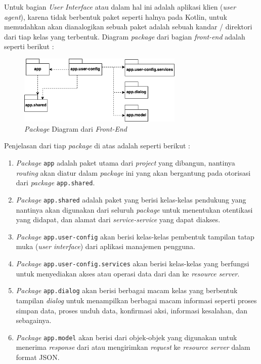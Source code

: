 \documentclass[pdftex,12pt, oneside]{article}
\begin{document}
Untuk bagian \textit{User Interface} atau dalam hal ini adalah aplikasi klien (\textit{user agent}), karena tidak berbentuk paket seperti halnya pada Kotlin, untuk memudahkan akan dianalogikan sebuah paket adalah sebuah kandar / direktori dari tiap kelas yang terbentuk. Diagram \textit{package} dari bagian \textit{front-end} adalah seperti berikut :

\begin{figure}[H]
	\centering
	\includegraphics[width=0.7\textwidth]{./resources/package-dia-fe}
	\caption{\textit{Package} Diagram dari \textit{Front-End}}
	\label{fig:package-dia-fe}
\end{figure}

Penjelasan dari tiap \textit{package} di atas adalah seperti berikut :

\begin{enumerate}
	\item \textit{Package} \texttt{app} adalah paket utama dari \textit{project} yang dibangun, nantinya \textit{routing} akan diatur dalam \textit{package} ini yang akan bergantung pada otorisasi dari \textit{package} \texttt{app.shared}.
	
	\item \textit{Package} \texttt{app.shared} adalah paket yang berisi kelas-kelas pendukung yang nantinya akan digunakan dari seluruh \textit{package} untuk menentukan otentikasi yang didapat, dan alamat dari \textit{service-service} yang dapat diakses.
	
	\item \textit{Package} \texttt{app.user-config} akan berisi kelas-kelas pembentuk tampilan tatap muka (\textit{user interface}) dari aplikasi manajemen pengguna.
	
	\item \textit{Package} \texttt{app.user-config.services} akan berisi kelas-kelas yang berfungsi untuk menyediakan akses atau operasi data dari dan ke \textit{resource server}.
	
	\item \textit{Package} \texttt{app.dialog} akan berisi berbagai macam kelas yang berbentuk tampilan \textit{dialog} untuk menampilkan berbagai macam informasi seperti proses simpan data, proses unduh data, konfirmasi aksi, informasi kesalahan, dan sebagainya.
	
	\item \textit{Package} \texttt{app.model} akan berisi dari objek-objek yang digunakan untuk menerima \textit{response} dari atau mengirimkan \textit{request} ke \textit{resource server} dalam format JSON.
\end{enumerate}
\end{document}
